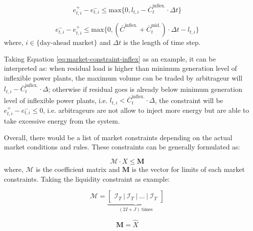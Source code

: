\begin{equation}
\label{eq:market-constraint-inflex}
 e^+_{t,i} - e^-_{t,i} \leq \text{max}\{0,l_{t,i} - \overline{C}_t^{\text{inflex.}} \cdot \Delta t\}
\end{equation}

\begin{equation}
\label{eq:market-constraint-peak}
e^-_{t,i} - e^+_{t,i} \leq  \text{max}\{0, (\overline{C}^{\text{inflex.}} + \overline{C}_t^{\text{mid.}} ) \cdot \Delta t - l_{t,i}\}
\end{equation}
where, $i  \in \{\text{day-ahead market}\}$ and $\Delta t$ is the length of time step.

Taking Equation \eqref{eq:market-constraint-inflex} as an example, it can be interpreted as: when residual load is higher than minimum generation level  of inflexible power plants, the maximum volume can be traded by arbitrageur will $l_{t,i} - \overline{C}_t^{\text{inflex.}} \cdot \Delta $; otherwise if residual goes is already below minimum generation level  of inflexible power plants, i.e. $l_{t,i} < \overline{C}_t^{\text{inflex.}} \cdot \Delta $, the constraint will be $ e^+_{t,i} - e^-_{t,i} \leq 0 $, i.e. arbitrageurs are not allow to inject more energy but are able to take excessive energy from the system. 

Overall, there would be a list of market constraints depending on the actual market conditions and rules. These constraints can be generally formulated as:

\begin{equation}
\mathcal{M} \cdot X \leq \mathbf{M}
\end{equation}
where, $\mathcal{M}$ is the coefficient matrix and $\mathbf{M}$ is the vector for limits of each market constraints. Taking the liquidity constraint as example:

\begin{equation*}
\mathcal{M} = \underbrace{\begin{bmatrix}
	\mathcal{I}_T~|~\mathcal{I}_T~|~ \dots~|~\mathcal{I}_T 
	\end{bmatrix}}_{(2I+J)~\text{times}}
\end{equation*}

\begin{equation*}
\mathbf{M} = \hat{X}
\end{equation*}

